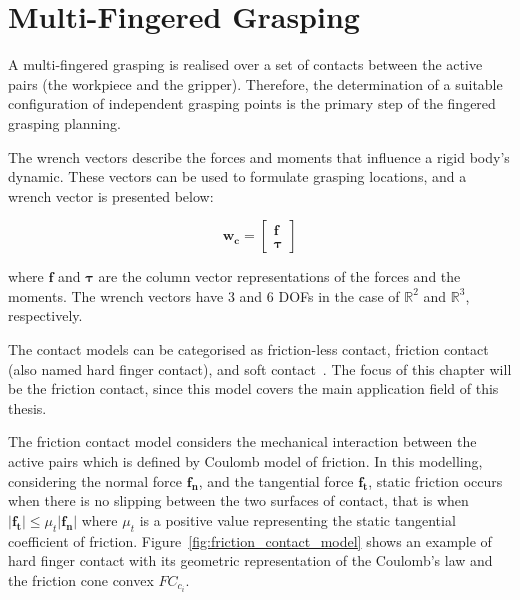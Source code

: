 \section{Multi-Fingered Grasping}
\label{sec:multifingered_grasping}

A multi-fingered grasping is realised over a set of contacts between the active pairs (the workpiece and the gripper). Therefore, the determination of a suitable configuration of independent grasping points is the primary step of the fingered grasping planning. 

The wrench vectors describe the forces and moments that influence a rigid body's dynamic. These vectors can be used to formulate grasping locations, and a wrench vector is presented below:  

\begin{equation}
\mathbf{w_{c}}=\left[\begin{array}{l}
\mathbf{f} \\
\boldsymbol{\tau}
\end{array}\right]
\end{equation}

\noindent
where $\mathbf{f}$ and $\boldsymbol{\tau}$ are the column vector representations of the forces and the moments. The wrench vectors have 3 and 6 \acp{DOF} in the case of $\mathbb{R}^2$ and $\mathbb{R}^3$, respectively.

The contact models can be categorised as friction-less contact, friction contact (also named hard finger contact), and soft contact~\cite{murray1994mathematical}. The focus of this chapter will be the friction contact, since this model covers the main application field of this thesis.


The friction contact model considers the mechanical interaction between the active pairs which is defined by Coulomb model of friction. In this modelling, considering the normal force $\mathbf{f_n}$, and the tangential force $\mathbf{f_t}$, static friction occurs when there is no slipping between the two surfaces of contact, that is when $\left|\mathbf{f_{t}}\right| \leq \mu_{t} |\mathbf{f_{n}}|
$ where $\mu_{t} $ is a positive value representing the static tangential coefficient of friction. Figure~\ref{fig:friction_contact_model} shows an example of hard finger contact with its geometric representation of the Coulomb’s law and the friction cone convex ${FC}_{c_i}$. 

